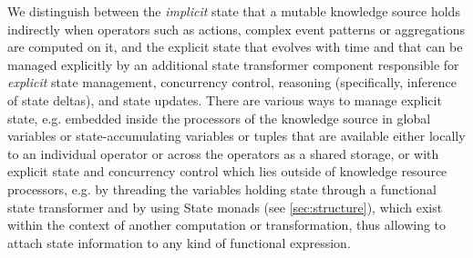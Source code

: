 \documentclass[runningheads]{llncs}
\begin{document}
We distinguish between the \textit{implicit} state that a mutable knowledge source holds indirectly when operators such as actions, complex  event patterns or aggregations are computed on it, and the explicit state that evolves with time and that can be managed explicitly by an additional state transformer component responsible for \textit{explicit} state management, concurrency control, reasoning (specifically, inference of state deltas), and state updates. 
There are various ways to manage explicit state, e.g. embedded inside the processors of the knowledge source in global variables or state-accumulating variables or tuples that are available either locally to an individual operator or across the operators as a shared storage, or with explicit state and concurrency control which lies outside of knowledge resource processors, e.g. by threading the variables holding state through a functional state transformer and by using State monads (see \ref{sec:structure}), which exist within the context of another computation or transformation, thus allowing to attach state information to any kind of functional expression.


\end{document}
